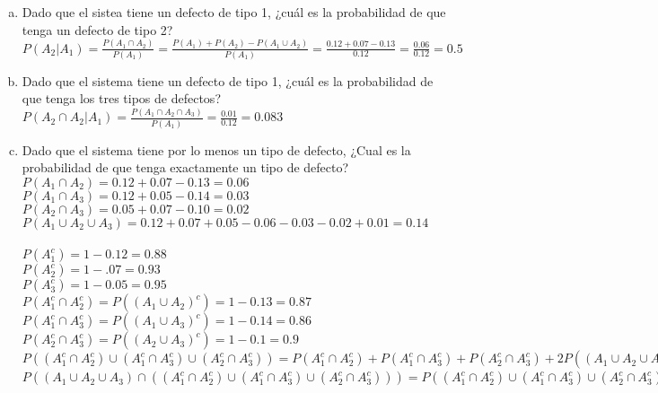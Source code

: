 \documentclass[12pt, letterpaper, spanish]{article}
\begin{document}
\begin{enumerate}[a)]
    \item Dado que el sistea tiene un defecto de tipo 1, ¿cuál es la probabilidad de que tenga un defecto de tipo 2?\\
    $P(A_2|A_1)=\displaystyle\frac{P(A_1\cap A_2)}{P(A_1)}=\displaystyle\frac{P(A_1)+P(A_2)-P(A_1\cup A_2)}{P(A_1)}=\displaystyle\frac{0.12+0.07-0.13}{0.12}=\displaystyle\frac{0.06}{0.12}=0.5$
    \item Dado que el sistema tiene un defecto de tipo 1, ¿cuál es la probabilidad de que tenga los tres tipos de defectos?\\
    $P(A_2\cap A_2|A_1)=\displaystyle\frac{P(A_1\cap A_2\cap A_3)}{P(A_1)}=\displaystyle\frac{0.01}{0.12}=0.083$
    \item Dado que el sistema tiene por lo menos un tipo de defecto, ¿Cual es la probabilidad de que tenga exactamente un tipo de defecto?\\
    $P(A_1\cap A_2)=0.12+0.07-0.13=0.06$\\
    $P(A_1\cap A_3)=0.12+0.05-0.14=0.03$\\
    $P(A_2\cap A_3)=0.05+0.07-0.10=0.02$\\
    $P(A_1\cup A_2\cup A_3)=0.12+0.07+0.05-0.06 -0.03-0.02+0.01=0.14$\\\\
    $P(A_1^c)=1-0.12=0.88$\\
    $P(A_2^c)=1-.07=0.93$\\
    $P(A_3^c)=1-0.05=0.95$\\

    $P(A_1^c\cap A_2^c)=P((A_1\cup A_2)^c)=1-0.13=0.87$\\
    $P(A_1^c\cap A_3^c)=P((A_1\cup A_3)^c)=1-0.14=0.86$\\
    $P(A_2^c\cap A_3^c)=P((A_2\cup A_3)^c)=1-0.1=0.9$\\
    $P((A_1^c\cap A_2^c)\cup (A_1^c\cap A_3^c)\cup (A_2^c\cap A_3^c))=P(A_1^c\cap A_2^c)+P(A_1^c\cap A_3^c)+P(A_2^c\cap A_3^c)+2P((A_1\cup A_2\cup A_3)^c)=0.87+0.86+0.9+2(0.86)=0.91$\\
    $P((A_1\cup A_2\cup A_3)\cap ((A_1^c\cap A_2^c)\cup (A_1^c\cap A_3^c)\cup (A_2^c\cap A_3^c)))=P((A_1^c\cap A_2^c)\cup (A_1^c\cap A_3^c)\cup (A_2^c\cap A_3^c))-P((A_1\cup A_2\cup A_3)^c)=0.91-0.86=0.05$\\


\end{enumerate}
\end{document}

